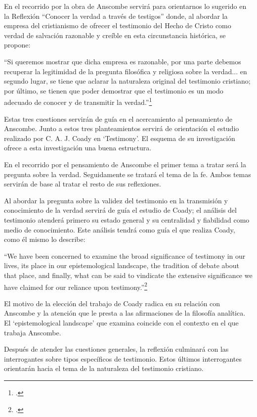 \documentclass[12pt]{article}
\begin{document}
{En el recorrido por la obra de Anscombe servirá para orientarnos lo sugerido en la Reflexión ``Conocer la verdad a través de testigos'' donde, al abordar la empresa del cristianismo de ofrecer el testimonio del Hecho de Cristo como verdad de salvación razonable y creíble en esta circunstancia histórica, se propone:

``Si queremos mostrar que dicha empresa es razonable, por una parte debemos recuperar la legitimidad de la pregunta filosófica y religiosa sobre la verdad... en segundo lugar, se tiene que aclarar la naturaleza original del testimonio cristiano; por último, se tienen que poder demostrar que el testimonio es un modo adecuado de conocer y de transmitir la verdad.''\footcite[p.~267]{pradesmulticr}

Estas tres cuestiones servirán de guía en el acercamiento al pensamiento de Anscombe. Junto a estos tres planteamientos servirá de orientación el estudio realizado por  C. A. J. Coady en `Testimony'. El esquema de su investigación ofrece a esta investigación una buena estructura.  

En el recorrido por el pensamiento de Anscombe el primer tema a tratar será la pregunta sobre la verdad. Seguidamente se tratará el tema de la fe. Ambos temas servirán de base al tratar el resto de sus reflexiones.

Al abordar la pregunta sobre la validez del testimonio en la transmisión y conocimiento de la verdad servirá de guía el estudio de Coady; el análisis del testimonio atenderá primero su estado general y su centralidad y fiabilidad como medio de conocimiento. Este análisis tendrá como guía el que realiza Coady, como él mismo lo describe:

``We have been concerned to examine the broad significance of testimony in our lives, its place in our epistemological landscape, the tradition of debate about that place, and finally, what can be said to vindicate the extensive significance we have claimed for our reliance upon testimony.''\footcite[p.~175]{testcoady}

El motivo de la elección del trabajo de Coady radica en su relación con Anscombe y la atención que le presta a las afirmaciones de la filosofía analítica. El `epistemological landscape' que examina coincide con el contexto en el que trabaja Anscombe.
 
Después de atender las cuestiones generales, la reflexión culminará con las interrogantes sobre tipos específicos de testimonio. Estos últimos interrogantes orientarán hacia el tema de la naturaleza del testimonio cristiano.

}
\end{document}

